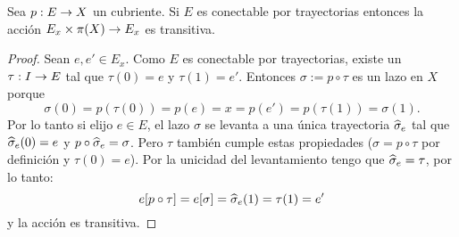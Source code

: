 \begin{ejercicio}\label{ej:33}
  Sea $p:E\rightarrow X$ un cubriente. Si $E$ es conectable por trayectorias entonces la acci\'on
  $E_x\times\pi(X)\rightarrow E_x$ es transitiva.
\end{ejercicio}
\begin{proof}%
  Sean $e,e'\in E_x$. Como $E$ es conectable por trayectorias, existe un $\tau:I\rightarrow E$ tal que
  $\tau(0)=e$ y $\tau(1)=e'$. Entonces $\sigma:=p\circ\tau$ es un lazo en $X$ porque
  \[
    \sigma(0)=p(\tau(0))=p(e)=x=p(e')=p(\tau(1))=\sigma(1).
  \]
  Por lo tanto si elijo $e\in E$, el lazo $\sigma$ se levanta a una \'unica trayectoria
  $\widehat{ \sigma }_e$ tal que $\widehat{ \sigma }_e(0)=e$ y $p\circ\widehat{ \sigma }_e=\sigma$. Pero
  $\tau$ tambi\'en cumple estas propiedades ($\sigma=p\circ\tau$ por definici\'on y $\tau(0)=e$).
  Por la unicidad del levantamiento tengo que $\widehat{ \sigma }_e=\tau$, por lo tanto:
  \[
    e[p\circ\tau]=e[\sigma]=\widehat{ \sigma }_e(1)=\tau(1)=e'
  \]
  y la acci\'on es transitiva.   
\end{proof}%

